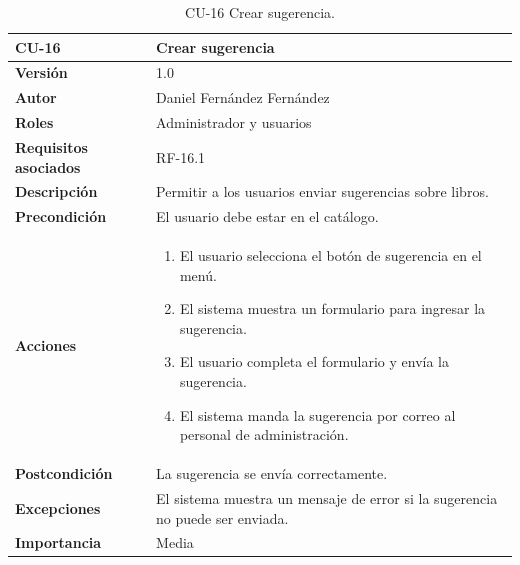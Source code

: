 \begin{table}[p]
        \centering
        \begin{tabularx}{\linewidth}{ p{} p{} }
            \toprule
            \textbf{CU-16} & \textbf{Crear sugerencia}\\
            \toprule
            \textbf{Versión} & 1.0 \\
            \textbf{Autor} & Daniel Fernández Fernández \\
            \textbf{Roles} & Administrador y usuarios \\
            \textbf{Requisitos asociados} & RF-16.1 \\
            \textbf{Descripción} & Permitir a los usuarios enviar sugerencias sobre libros. \\
            \textbf{Precondición} & El usuario debe estar en el catálogo. \\
            \textbf{Acciones} &
            \begin{enumerate}
            \def\labelenumi{\arabic{enumi}.}
            \tightlist
            \item El usuario selecciona el botón de sugerencia en el menú.
            \item El sistema muestra un formulario para ingresar la sugerencia.
            \item El usuario completa el formulario y envía la sugerencia.
            \item El sistema manda la sugerencia por correo al personal de administración.
            \end{enumerate}\\
            \textbf{Postcondición} & La sugerencia se envía correctamente. \\
            \textbf{Excepciones} & El sistema muestra un mensaje de error si la sugerencia no puede ser enviada. \\
            \textbf{Importancia} & Media \\
            \bottomrule
        \end{tabularx}
        \caption{CU-16 Crear sugerencia.}
\end{table}

